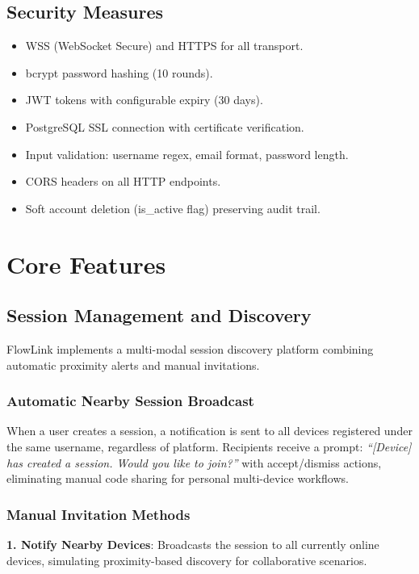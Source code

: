 \documentclass[conference]{IEEEtran}
\begin{document}
\subsection{Security Measures}

\begin{itemize}
    \item WSS (WebSocket Secure) and HTTPS for all transport.
    \item bcrypt password hashing (10 rounds).
    \item JWT tokens with configurable expiry (30 days).
    \item PostgreSQL SSL connection with certificate verification.
    \item Input validation: username regex, email format, password length.
    \item CORS headers on all HTTP endpoints.
    \item Soft account deletion (is\_active flag) preserving audit trail.
\end{itemize}

\section{Core Features}

\subsection{Session Management and Discovery}

FlowLink implements a multi-modal session discovery platform combining automatic proximity alerts and manual invitations.

\subsubsection{Automatic Nearby Session Broadcast}

When a user creates a session, a notification is sent to all devices registered under the same username, regardless of platform. Recipients receive a prompt: \textit{``[Device] has created a session. Would you like to join?''} with accept/dismiss actions, eliminating manual code sharing for personal multi-device workflows.

\subsubsection{Manual Invitation Methods}

\textbf{1. Notify Nearby Devices}: Broadcasts the session to all currently online devices, simulating proximity-based discovery for collaborative scenarios.
\end{document}
